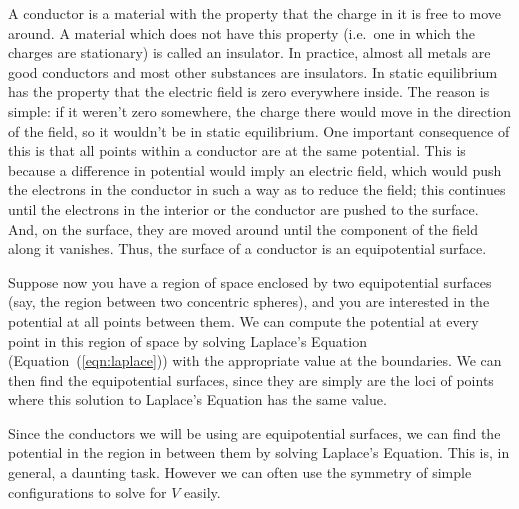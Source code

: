 A conductor is a material with the property that the charge in it is free to move around. A material which does not have this property (i.e.\ one in which the charges are stationary) is called an insulator. In practice, almost all metals are good conductors and most other substances are insulators. In static equilibrium has the property that the electric field is zero everywhere inside. The reason is simple: if it weren't zero somewhere, the charge there would move in the direction of the field, so it wouldn't be in static equilibrium. One important consequence of this is that all points within a conductor are at the same potential. This is because a difference in potential would imply an electric field, which would push the electrons in the conductor in such a way as to reduce the field; this continues until the electrons in the interior or the conductor are pushed to the surface. And, on the surface, they are moved around until the component of the field along it vanishes. Thus, the surface of a conductor is an equipotential surface.

\begin{imp}
Suppose now you have a region of space enclosed by two equipotential surfaces (say, the region between two concentric spheres), and you are interested in the potential at all points between them. We can compute the potential at every point in this region of space by solving Laplace's Equation (Equation~(\ref{eqn:laplace})) with the appropriate value at the boundaries. We can then find the equipotential surfaces, since they are simply are the loci of points where this solution to Laplace's Equation has the same value.
\end{imp}


Since the conductors we will be using are equipotential surfaces, we can find the potential in the region in between them by solving Laplace's Equation. This is, in general, a daunting task. However we can often use the symmetry of simple configurations to solve for $V$ easily.

